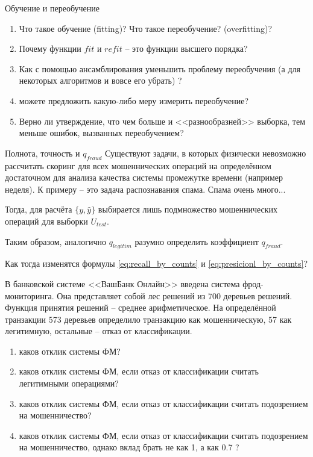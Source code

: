 \documentclass{beamer}
\begin{document}
  	\begin{frame}{Обучение и переобучение}
  		\begin{enumerate}
  			\item Что такое обучение (fitting)? Что такое переобучение? (overfitting)?
  			\item Почему функции $fit$ и $refit$ -- это функции высшего порядка?
  			\item Как с помощью ансамблирования уменьшить проблему переобучения (а для некоторых алгоритмов и вовсе его убрать) ?
  			\item можете предложить какую-либо меру измерить переобучение?
  			\item Верно ли утверждение, что чем больше и <<разнообразней>> выборка, тем меньше ошибок, вызванных переобучением?
  		\end{enumerate} 
	\end{frame}
  	
 \begin{frame}{Полнота, точность и $q_{fraud}$}
 		Существуют задачи, в которых физически невозможно рассчитать скоринг для всех 
 		мошеннических операций на определённом достаточном для анализа качества системы промежутке времени (например неделя).
 		К примеру -- это задача распознавания спама. Спама очень много...
 		
 		Тогда, для расчёта $\{y, \hat y\}$ выбирается лишь подмножество мошеннических операций для выборки $U_{test}$.
 		
 		Таким образом, аналогично $q_{legitim}$ разумно определить коэффициент $q_{fraud}$.
 		
 		Как тогда изменятся формулы \eqref{eq:recall_by_counts} и \eqref{eq:presicionl_by_counts}?
 \end{frame}
  
  
 \begin{frame}
  В банковской системе <<ВашБанк Онлайн>> введена система фрод-мониторинга. 
  Она представляет собой лес решений из 700 деревьев решений. Функция принятия решений -- среднее арифметическое. На определённой транзакции 573 деревьев определило транзакцию как мошенническую, 57 как легитимную, остальные -- отказ от классификации.
  \begin{enumerate}
  	\item каков отклик системы ФМ?
  	\item каков отклик системы ФМ, если отказ от классификации считать легитимными операциями?
  	\item каков отклик системы ФМ, если отказ от классификации считать подозрением на мошенничество?
  	\item каков отклик системы ФМ, если отказ от классификации считать подозрением на мошенничество, однако вклад брать не как 1, а как 0.7 ?
  \end{enumerate}
  
\end{frame}
\end{document}

